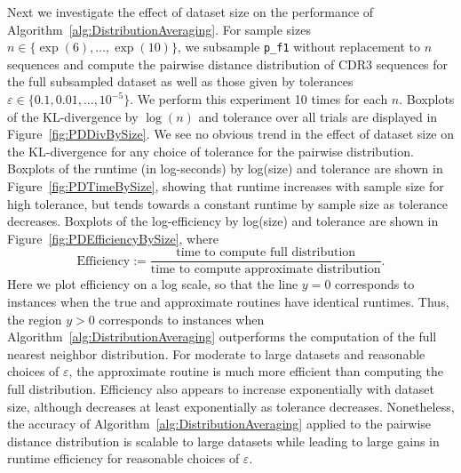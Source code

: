 \documentclass{article}
\begin{document}
Next we investigate the effect of dataset size on the performance of Algorithm~\ref{alg:DistributionAveraging}.
For sample sizes $n \in \{\exp(6), \dotsc, \exp(10)\}$, we subsample \texttt{p\_f1} without replacement to $n$ sequences and compute the pairwise distance distribution of CDR3 sequences for the full subsampled dataset as well as those given by tolerances $\varepsilon \in \{0.1, 0.01, ..., 10^{-5} \}$.
We perform this experiment 10 times for each $n$.
Boxplots of the KL-divergence by $\log(n)$ and tolerance over all trials are displayed in Figure~\ref{fig:PDDivBySize}.
We see no obvious trend in the effect of dataset size on the KL-divergence for any choice of tolerance for the pairwise distribution.
Boxplots of the runtime (in log-seconds) by log(size) and tolerance are shown in Figure~\ref{fig:PDTimeBySize}, showing that runtime increases with sample size for high tolerance, but tends towards a constant runtime by sample size as tolerance decreases.
Boxplots of the log-efficiency by log(size) and tolerance are shown in Figure~\ref{fig:PDEfficiencyBySize}, where
\begin{equation}\label{eq:Efficiency}
	\text{Efficiency} :=
		\frac{\text{time to compute full distribution}
		}{
			  \text{time to compute approximate distribution}
		}.
\end{equation}
Here we plot efficiency on a log scale, so that the line $y=0$ corresponds to instances when the true and approximate routines have identical runtimes.
Thus, the region $y > 0$ corresponds to instances when Algorithm~\ref{alg:DistributionAveraging} outperforms the computation of the full nearest neighbor distribution.
For moderate to large datasets and reasonable choices of $\varepsilon$, the approximate routine is much more efficient than computing the full distribution.
Efficiency also appears to increase exponentially with dataset size, although decreases at least exponentially as tolerance decreases.
Nonetheless, the accuracy of Algorithm~\ref{alg:DistributionAveraging} applied to the pairwise distance distribution is scalable to large datasets while leading to large gains in runtime efficiency for reasonable choices of $\varepsilon$.
\end{document}
